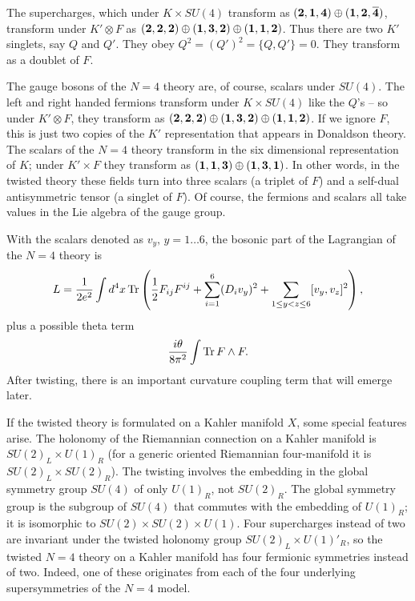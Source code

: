 \documentclass[12pt]{article}
\numberwithin{equation}{section}
\def\bar{\overline}
\DeclareMathOperator{\Tr}{Tr}
\begin{document}
The supercharges, which under $K\times SU(4)$
transform as $({\bf 2},{\bf 1},{\bf 4})\oplus ({\bf 1}, {\bf 2},
\bar{\bf 4})$, transform under $K'\otimes F$ as
$({\bf 2},{\bf 2},{\bf 2})
\oplus ({\bf 1},{\bf 3},{\bf 2})\oplus ({\bf 1},{\bf 1},{\bf 2})$.
Thus there
are two $K'$ singlets, say $Q$ and $Q'$.  They obey $Q^2=(Q')^2
=\{Q,Q'\}=0$.  They transform as a doublet of $F$.

The gauge bosons of the $N=4 $ theory are, of course, scalars under $SU(4)$.
The left and right handed fermions transform under $K\times SU(4)$
like the $Q$'s -- so under $K'\otimes F$, they transform as
$({\bf 2},{\bf 2},{\bf 2})\oplus ({\bf 1},{\bf 3},{\bf 2})
\oplus ({\bf 1},{\bf 1},{\bf 2})$.
If we ignore $F$, this is just two copies of the $K'$ representation
that appears in Donaldson theory.
The scalars of the $N=4$ theory transform in the six dimensional representation
of $K$; under $K'\times F$ they transform as $({\bf 1},{\bf 1},{\bf 3})
\oplus ({\bf 1},{\bf 3},{\bf 1})$.  In other words, in the twisted
theory these fields turn into three scalars (a triplet of $F$)
and a self-dual antisymmetric tensor (a singlet of $F$).  Of course, the
fermions and scalars all take values in the Lie algebra of the gauge
group.

With the scalars denoted as $v_y,\,y=1\dots 6$,
the bosonic part of the Lagrangian of the $N=4$
theory is
\begin{equation}
  \label{plsk}
  L={1\over 2e^2}\int d^4x\Tr\left({1\over 2} F_{ij}F^{ij}
  +\sum_{i=1}^6(D_iv_y)^2+\sum_{1\leq y<z\leq 6}[v_y,v_z]^2\right),
\end{equation}
plus a possible theta term
\begin{equation}
  \label{lsk}
  {i\theta\over 8 \pi^2}\int\Tr F\wedge F.
\end{equation}
After twisting, there is an important curvature coupling term
that will emerge later.

If the twisted theory is formulated on a Kahler manifold $X$, some special
features arise.  The holonomy of the Riemannian connection on a Kahler
manifold is $SU(2)_L\times U(1)_R$ (for a generic oriented
Riemannian four-manifold it is  $SU(2)_L\times SU(2)_R$).  The twisting
involves the embedding in the global symmetry group $SU(4)$ of only $U(1)_R$,
not $SU(2)_R$.  The global symmetry group is the subgroup of $SU(4)$ that
commutes with the embedding of $U(1)_R$; it is isomorphic to
$SU(2)\times SU(2)\times U(1)$. Four supercharges instead of two are invariant
under
the twisted holonomy group $SU(2)_L\times U(1)'{}_R$, so  the twisted
$N=4$ theory on a Kahler manifold has four fermionic symmetries instead of two.
Indeed, one of these originates from each of the four underlying
supersymmetries
of the $N=4$ model.
\end{document}
